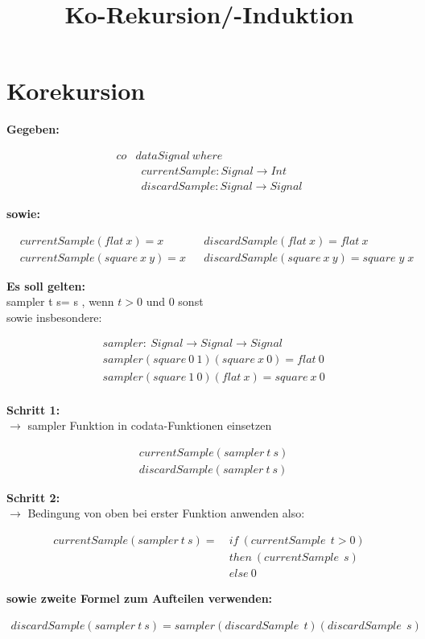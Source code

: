 \documentclass{article}
\title{Ko-Rekursion/-Induktion}
\date{ }
\begin{document}
	\section{Korekursion}
	\textbf{Gegeben:}
		\begin{fleqn}
				\begin{align*}
					co&data Signal\:where  \\
					& \enspace currentSample : Signal \rightarrow Int \\
					& \enspace discardSample : Signal \rightarrow Signal
				\end{align*}
		\end{fleqn}
	\textbf{sowie:}
	\begin{fleqn}
	\begin{align*}
		&currentSample(flat\:x) = x			&
		&discardSample(flat\:x) = flat\:x	\\
		&currentSample(square\:x\:y) = x		&
		&discardSample(square\:x\:y) = square\;y\;x	
	\end{align*}	
	\end{fleqn}
	\textbf{Es soll gelten:}\\
	sampler t s\enspace = s , wenn $t>0$ und 0 sonst\\
	sowie insbesondere:
	\begin{fleqn}
	\begin{align*}
		&sampler:\:Signal\rightarrow Signal\rightarrow Signal \\
		&sampler(square\:0\:1)(square\:x\:0) = flat\:0 \\
		&sampler(square\:1\:0)(flat\:x) = square\:x\:0  \\
	\end{align*}	
	\end{fleqn}
	\textbf{Schritt 1:}\\
	$\rightarrow$ sampler Funktion in codata-Funktionen einsetzen
	\begin{fleqn}
	\begin{align*}
		&currentSample(sampler\:t\:s)\\
		&discardSample(sampler\:t\:s)	
	\end{align*}	
	\end{fleqn}
	\textbf{Schritt 2:}\\
	$\rightarrow$ Bedingung von oben bei erster Funktion anwenden also:
	\begin{fleqn}
		\begin{align*}
			currentSample(sampler\:t\:s) = \:&if\:(currentSample\:\:t>0)\\
											&then\:(currentSample\:\:s)\\
											&else\:0
		\end{align*}
	\end{fleqn}
	\textbf{sowie zweite Formel zum Aufteilen verwenden:}
		\begin{fleqn}
		\begin{align*}
			discardSample(sampler\:t\:s) = sampler(discardSample\:\:t)(discardSample\:\:s)
		\end{align*}
	\end{fleqn}
	\newpage
\end{document}
